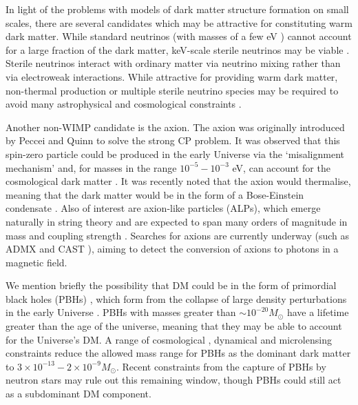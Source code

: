 In light of the problems with models of dark matter structure formation on small scales, there are several candidates which may be attractive for constituting warm dark matter. While standard neutrinos (with masses of a few eV \cite{Amsler:2008}) cannot account for a large fraction of the dark matter, keV-scale sterile neutrinos may be viable \cite{Dodelson:1994}. Sterile neutrinos interact with ordinary matter via neutrino mixing rather than via electroweak interactions. While attractive for providing warm dark matter, non-thermal production \cite{Shi:1999} or multiple sterile neutrino species \cite{Asaka:2006} may be required to avoid many astrophysical and cosmological constraints \cite{Hansen:2002,Abazajian:2006}.

Another non-WIMP candidate is the axion. The axion was originally introduced by Peccei and Quinn \cite{Peccei:1977} to solve the strong CP problem. It was observed that this spin-zero particle could be produced in the early Universe via the `misalignment mechanism' and, for masses in the range $10^{-5} - 10^{-3}$ eV, can account for the cosmological dark matter \cite{Raffelt:1995}. It was recently noted that the axion would thermalise, meaning that the dark matter would be in the form of a Bose-Einstein condensate \cite{Sikivie:2009}. Also of interest are axion-like particles (ALPs), which emerge naturally in string theory and are expected to span many orders of magnitude in mass and coupling strength \cite{Arvanitaki:2009}. Searches for axions are currently underway (such as ADMX \cite{Rybka:2014} and CAST \cite{Arik:2013}), aiming to detect the conversion of axions to photons in a magnetic field.

We mention briefly the possibility that DM could be in the form of primordial black holes (PBHs) \cite{Hawking:1971}, which form from the collapse of large density perturbations in the early Universe \cite{Carr:1974}. PBHs with masses greater than $\sim 10^{-20} M_\odot$ have a lifetime greater than the age of the universe, meaning that they may be able to account for the Universe's DM. A range of cosmological \cite{Carr:2010}, dynamical \cite{Carr:1999} and microlensing \cite{Griest:2013} constraints reduce the allowed mass range for PBHs as the dominant dark matter to $3 \times 10^{-13} - 2 \times 10^{-9} M_\odot$. Recent constraints from the capture of PBHs by neutron stars \cite{Pani:2014} may rule out this remaining window, though PBHs could still act as a subdominant DM component.


